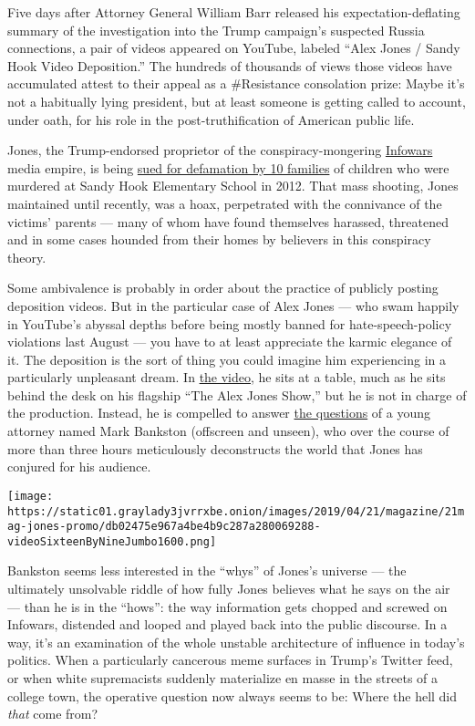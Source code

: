 Five days after Attorney General William Barr released his
expectation-deflating summary of the investigation into the Trump
campaign's suspected Russia connections, a pair of videos appeared on
YouTube, labeled ``Alex Jones / Sandy Hook Video Deposition.'' The
hundreds of thousands of views those videos have accumulated attest to
their appeal as a \#Resistance consolation prize: Maybe it's not a
habitually lying president, but at least someone is getting called to
account, under oath, for his role in the post-truthification of American
public life.

Jones, the Trump-endorsed proprietor of the conspiracy-mongering
\href{https://www.nytimes3xbfgragh.onion/2019/12/09/us/politics/owen-shroyer-infowars.html}{Infowars}
media empire, is being
\href{https://www.nytimes3xbfgragh.onion/2019/02/07/us/politics/alex-jones-sandy-hook.html}{sued
for defamation by 10 families} of children who were murdered at Sandy
Hook Elementary School in 2012. That mass shooting, Jones maintained
until recently, was a hoax, perpetrated with the connivance of the
victims' parents --- many of whom have found themselves harassed,
threatened and in some cases hounded from their homes by believers in
this conspiracy theory.

Some ambivalence is probably in order about the practice of publicly
posting deposition videos. But in the particular case of Alex Jones ---
who swam happily in YouTube's abyssal depths before being mostly banned
for hate-speech-policy violations last August --- you have to at least
appreciate the karmic elegance of it. The deposition is the sort of
thing you could imagine him experiencing in a particularly unpleasant
dream. In \href{https://www.youtube.com/watch?v=I7siWJ86g40}{the video},
he sits at a table, much as he sits behind the desk on his flagship
``The Alex Jones Show,'' but he is not in charge of the production.
Instead, he is compelled to answer
\href{https://www.youtube.com/watch?v=XES-AydpIoc}{the questions} of a
young attorney named Mark Bankston (offscreen and unseen), who over the
course of more than three hours meticulously deconstructs the world that
Jones has conjured for his audience.

\texttt{[image: https://static01.graylady3jvrrxbe.onion/images/2019/04/21/magazine/21mag-jones-promo/db02475e967a4be4b9c287a280069288-videoSixteenByNineJumbo1600.png]}

Bankston seems less interested in the ``whys'' of Jones's universe ---
the ultimately unsolvable riddle of how fully Jones believes what he
says on the air --- than he is in the ``hows'': the way information gets
chopped and screwed on Infowars, distended and looped and played back
into the public discourse. In a way, it's an examination of the whole
unstable architecture of influence in today's politics. When a
particularly cancerous meme surfaces in Trump's Twitter feed, or when
white supremacists suddenly materialize en masse in the streets of a
college town, the operative question now always seems to be: Where the
hell did \emph{that} come from?

